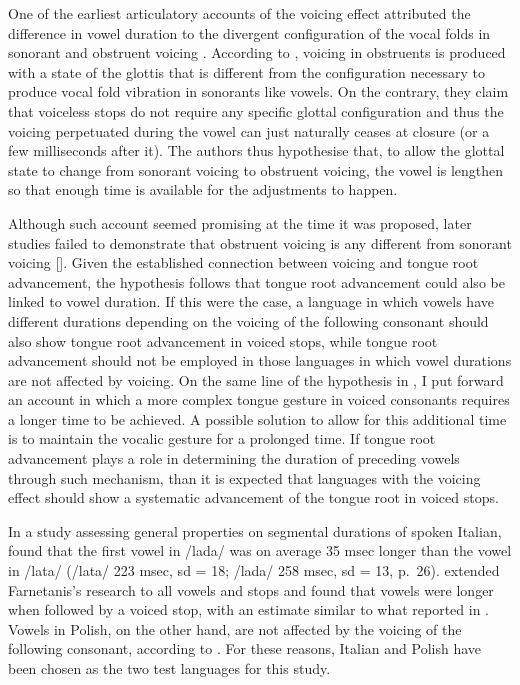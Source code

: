 \documentclass[authoryear, twocolumn]{elsarticle}
\begin{document}
One of the earliest articulatory accounts of the voicing effect
attributed the difference in vowel duration to the divergent
configuration of the vocal folds in sonorant and obstruent voicing
\citetext{\citealp{halle1967}; \citealp[reiterated in][]{chomsky1968}}.
According to \citet{halle1967}, voicing in obstruents is produced with a
state of the glottis that is different from the configuration necessary
to produce vocal fold vibration in sonorants like vowels. On the
contrary, they claim that voiceless stops do not require any specific
glottal configuration and thus the voicing perpetuated during the vowel
can just naturally ceases at closure (or a few milliseconds after it).
The authors thus hypothesise that, to allow the glottal state to change
from sonorant voicing to obstruent voicing, the vowel is lengthen so
that enough time is available for the adjustments to happen.

Although such account seemed promising at the time it was proposed,
later studies failed to demonstrate that obstruent voicing is any
different from sonorant voicing {[}{]}. Given the established connection
between voicing and tongue root advancement, the hypothesis follows that
tongue root advancement could also be linked to vowel duration. If this
were the case, a language in which vowels have different durations
depending on the voicing of the following consonant should also show
tongue root advancement in voiced stops, while tongue root advancement
should not be employed in those languages in which vowel durations are
not affected by voicing. On the same line of the hypothesis in
\citet{halle1967}, I put forward an account in which a more complex
tongue gesture in voiced consonants requires a longer time to be
achieved. A possible solution to allow for this additional time is to
maintain the vocalic gesture for a prolonged time. If tongue root
advancement plays a role in determining the duration of preceding vowels
through such mechanism, than it is expected that languages with the
voicing effect should show a systematic advancement of the tongue root
in voiced stops.

In a study assessing general properties on segmental durations of spoken
Italian, \citet{farnetani1986} found that the first vowel in /lada/ was
on average 35 msec longer than the vowel in /lata/ (/lata/ 223 msec, sd
= 18; /lada/ 258 msec, sd = 13, p.~26). \citet{esposito2002} extended
Farnetanis's research to all vowels and stops and found that vowels were
longer when followed by a voiced stop, with an estimate similar to what
reported in \citet{farnetani1986}. Vowels in Polish, on the other hand,
are not affected by the voicing of the following consonant, according to
\citet{keating1984}. For these reasons, Italian and Polish have been
chosen as the two test languages for this study.
\end{document}

